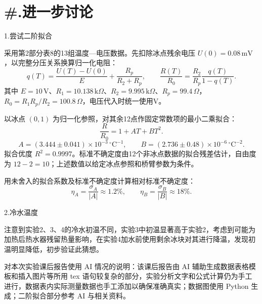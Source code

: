 \documentclass[UTF8,a4paper,zihao=-4,fontset=fandol]{ctexart}
\begin{document}
\section*{\#.进一步讨论}
\noindent 1.尝试二阶拟合

采用第2部分表8的13组温度—电压数据。先扣除冰点残余电压 $U(0)=0.08\,\mathrm{mV}$，以完整分压关系换算归一化电阻：
\[
q(T)=\frac{U(T)-U(0)}E+\frac{R_p}{R_2+R_p},\qquad
\frac{R(T)}{R_0}=\frac{R_2}{R_p}\frac{q(T)}{1-q(T)}.
\]
其中 $E=10\,\mathrm V$、$R_1=10.138\,\mathrm{k}\Omega$、$R_2=9.995\,\mathrm{k}\Omega$、$R_p=99.4\,\Omega$，$R_0=R_1R_p/R_2=100.8\,\Omega$，电压代入时统一使用V。

以冰点 $(0,1)$ 为归一化参照，对其余12点作固定常数项的最小二乘拟合：
\[
\frac{R}{R_0}=1+AT+BT^2.
\]
\[
\boxed{A=(3.444\pm0.041)\times10^{-3}\,{}^{\circ}\mathrm C^{-1}},\qquad
\boxed{B=(2.736\pm0.48)\times10^{-6}\,{}^{\circ}\mathrm C^{-2}}.
\]
拟合优度 $R^2=0.9997$。标准不确定度由12个非冰点数据的拟合残差估计，自由度为 $12-2=10$；上述数值以给定冰点参照和桥臂参数为条件。

用未舍入的拟合系数及标准不确定度计算相对标准不确定度：
\[
\eta_A=\frac{\sigma_A}{|A|}\approx1.2\%,\qquad
\eta_B=\frac{\sigma_B}{|B|}\approx18\%.
\]

\medskip
\noindent 2.冷水温度

注意到实验2、3、4的冷水初温不同，实验3中初温显著高于实验2，考虑到可能为加热后热水器残留热量影响，在实验4加水前使用剩余冰块对其进行降温，发现初温明显降低，初步验证此猜想。

\medskip
\noindent 对本次实验课后报告使用 AI 情况的说明：该课后报告由 AI 辅助生成数据表格模板和插入图片等所用 tex 语句较复杂的部分，实验分析文字和公式计算仍为手工进行，数据表内实际测量数据也手工添加以确保准确真实；数据图使用 Python 生成；二阶拟合部分参考 AI 与相关资料。
\end{document}
